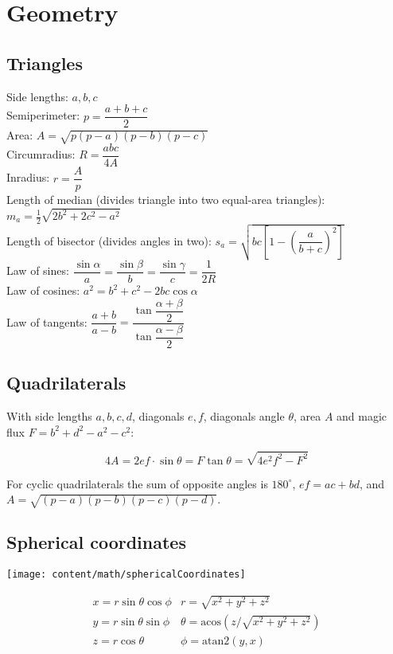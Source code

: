 \section{Geometry}

\subsection{Triangles}
Side lengths: $a,b,c$\\
Semiperimeter: $p=\dfrac{a+b+c}{2}$\\
Area: $A=\sqrt{p(p-a)(p-b)(p-c)}$\\
Circumradius: $R=\dfrac{abc}{4A}$\\
Inradius: $r=\dfrac{A}{p}$\\
Length of median (divides triangle into two equal-area triangles): $m_a=\tfrac{1}{2}\sqrt{2b^2+2c^2-a^2}$\\
Length of bisector (divides angles in two): $s_a=\sqrt{bc\left[1-\left(\dfrac{a}{b+c}\right)^2\right]}$\\
Law of sines: $\dfrac{\sin\alpha}{a}=\dfrac{\sin\beta}{b}=\dfrac{\sin\gamma}{c}=\dfrac{1}{2R}$\\
Law of cosines: $a^2=b^2+c^2-2bc\cos\alpha$\\
Law of tangents: $\dfrac{a+b}{a-b}=\dfrac{\tan\dfrac{\alpha+\beta}{2}}{\tan\dfrac{\alpha-\beta}{2}}$\\

\subsection{Quadrilaterals}
With side lengths $a,b,c,d$, diagonals $e, f$, diagonals angle $\theta$, area $A$ and
magic flux $F=b^2+d^2-a^2-c^2$:

\[ 4A = 2ef \cdot \sin\theta = F\tan\theta = \sqrt{4e^2f^2-F^2} \]

 For cyclic quadrilaterals the sum of opposite angles is $180^\circ$,
$ef = ac + bd$, and $A = \sqrt{(p-a)(p-b)(p-c)(p-d)}$.

\subsection{Spherical coordinates}
\centerline{\texttt{[image: content/math/sphericalCoordinates]}}
\[\begin{array}{cc}
x = r\sin\theta\cos\phi & r = \sqrt{x^2+y^2+z^2}\\
y = r\sin\theta\sin\phi & \theta = \textrm{acos}(z/\sqrt{x^2+y^2+z^2})\\
z = r\cos\theta & \phi = \textrm{atan2}(y,x)
\end{array}\]

